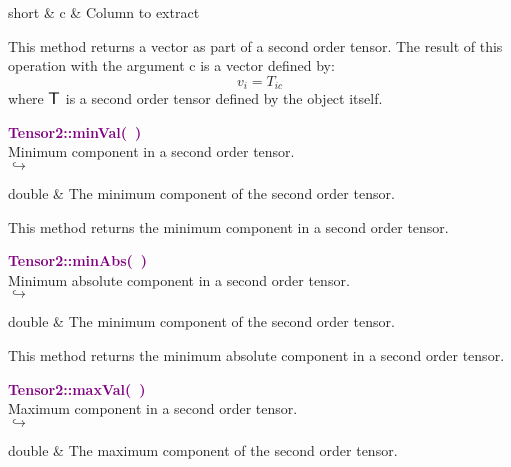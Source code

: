 \begin{tcolorbox}[width=\textwidth,myArgs,tabularx={ll|R}]
short & c & Column to extract
\end{tcolorbox}

This method returns a vector as part of a second order tensor.
The result of this operation with the argument c is a vector defined by:
\begin{equation*}
v_{i} = T_{ic}
\end{equation*}
where $\mbox{\large\ensuremath{\mathsf{T}}}$ is a second order tensor defined by the object itself.

\textcolor{purple}{\textbf{Tensor2::minVal(~)}}\label{Tensor2::minVal()}\\
Minimum component in a second order tensor.\\ \hspace*{5mm}$\hookrightarrow$
\vspace*{-2em}\begin{tcolorbox}[grow to left by=-1cm, width=\textwidth-1cm,myArgs,tabularx={l|R}]
double & The minimum component of the second order tensor.
\end{tcolorbox}

This method returns the minimum component in a second order tensor.

\textcolor{purple}{\textbf{Tensor2::minAbs(~)}}\label{Tensor2::minAbs()}\\
Minimum absolute component in a second order tensor.\\ \hspace*{5mm}$\hookrightarrow$
\vspace*{-2em}\begin{tcolorbox}[grow to left by=-1cm, width=\textwidth-1cm,myArgs,tabularx={l|R}]
double & The minimum component of the second order tensor.
\end{tcolorbox}

This method returns the minimum absolute component in a second order tensor.

\textcolor{purple}{\textbf{Tensor2::maxVal(~)}}\label{Tensor2::maxVal()}\\
Maximum component in a second order tensor.\\ \hspace*{5mm}$\hookrightarrow$
\vspace*{-2em}\begin{tcolorbox}[grow to left by=-1cm, width=\textwidth-1cm,myArgs,tabularx={l|R}]
double & The maximum component of the second order tensor.
\end{tcolorbox}

